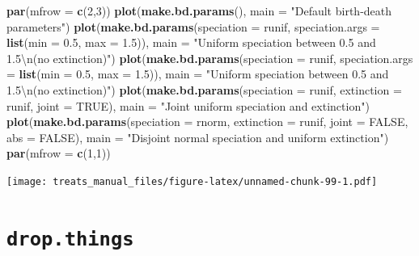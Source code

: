\documentclass[
]{book}
\newenvironment{Shaded}{\begin{snugshade}}{\end{snugshade}}
\newcommand{\CharTok}[1]{\textcolor[rgb]{0.31,0.60,0.02}{#1}}
\newcommand{\DataTypeTok}[1]{\textcolor[rgb]{0.13,0.29,0.53}{#1}}
\newcommand{\DecValTok}[1]{\textcolor[rgb]{0.00,0.00,0.81}{#1}}
\newcommand{\FloatTok}[1]{\textcolor[rgb]{0.00,0.00,0.81}{#1}}
\newcommand{\KeywordTok}[1]{\textcolor[rgb]{0.13,0.29,0.53}{\textbf{#1}}}
\newcommand{\NormalTok}[1]{#1}
\newcommand{\OtherTok}[1]{\textcolor[rgb]{0.56,0.35,0.01}{#1}}
\newcommand{\StringTok}[1]{\textcolor[rgb]{0.31,0.60,0.02}{#1}}
\begin{document}
\begin{Shaded}
\begin{Highlighting}[]
\KeywordTok{par}\NormalTok{(}\DataTypeTok{mfrow =} \KeywordTok{c}\NormalTok{(}\DecValTok{2}\NormalTok{,}\DecValTok{3}\NormalTok{))}
\KeywordTok{plot}\NormalTok{(}\KeywordTok{make.bd.params}\NormalTok{(), }\DataTypeTok{main =} \StringTok{"Default birth{-}death parameters"}\NormalTok{)}
\KeywordTok{plot}\NormalTok{(}\KeywordTok{make.bd.params}\NormalTok{(}\DataTypeTok{speciation =}\NormalTok{ runif,}
               \DataTypeTok{speciation.args =} \KeywordTok{list}\NormalTok{(}\DataTypeTok{min =} \FloatTok{0.5}\NormalTok{, }\DataTypeTok{max =} \FloatTok{1.5}\NormalTok{)),}
     \DataTypeTok{main =} \StringTok{"Uniform speciation between 0.5 and 1.5}\CharTok{\textbackslash{}n}\StringTok{(no extinction)"}\NormalTok{)}
\KeywordTok{plot}\NormalTok{(}\KeywordTok{make.bd.params}\NormalTok{(}\DataTypeTok{speciation =}\NormalTok{ runif,}
                    \DataTypeTok{speciation.args =} \KeywordTok{list}\NormalTok{(}\DataTypeTok{min =} \FloatTok{0.5}\NormalTok{, }\DataTypeTok{max =} \FloatTok{1.5}\NormalTok{)),}
     \DataTypeTok{main =} \StringTok{"Uniform speciation between 0.5 and 1.5}\CharTok{\textbackslash{}n}\StringTok{(no extinction)"}\NormalTok{)}
\KeywordTok{plot}\NormalTok{(}\KeywordTok{make.bd.params}\NormalTok{(}\DataTypeTok{speciation =}\NormalTok{ runif, }\DataTypeTok{extinction =}\NormalTok{ runif, }\DataTypeTok{joint =} \OtherTok{TRUE}\NormalTok{),}
     \DataTypeTok{main =} \StringTok{"Joint uniform speciation and extinction"}\NormalTok{)}
\KeywordTok{plot}\NormalTok{(}\KeywordTok{make.bd.params}\NormalTok{(}\DataTypeTok{speciation =}\NormalTok{ rnorm, }\DataTypeTok{extinction =}\NormalTok{ runif,}
                    \DataTypeTok{joint =} \OtherTok{FALSE}\NormalTok{, }\DataTypeTok{abs =} \OtherTok{FALSE}\NormalTok{),}
     \DataTypeTok{main =} \StringTok{"Disjoint normal speciation and uniform extinction"}\NormalTok{)}
\KeywordTok{par}\NormalTok{(}\DataTypeTok{mfrow =} \KeywordTok{c}\NormalTok{(}\DecValTok{1}\NormalTok{,}\DecValTok{1}\NormalTok{))}
\end{Highlighting}
\end{Shaded}

\texttt{[image: treats\_manual\_files/figure-latex/unnamed-chunk-99-1.pdf]}

\hypertarget{dropthings}{%
\section{\texorpdfstring{\texttt{drop.things}}{drop.things}}\label{dropthings}}
\end{document}
